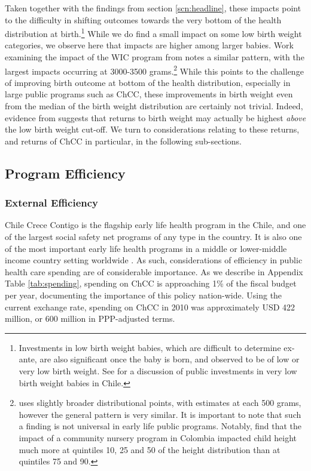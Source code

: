 \documentclass[12pt]{article}
\begin{document}
\begin{spacing}{1.4}
Taken together with the findings from section \ref{scn:headline}, these
impacts point to the difficulty in shifting outcomes towards the very
bottom of the health distribution at birth.\footnote{Investments in low
  birth weight babies, which are difficult to determine ex-ante, are also
  significant once the baby is born, and observed to be of low or very
  low birth weight.  See \citet{Bharadwajetal2013} for a discussion of
  public investments in very low birth weight babies in Chile.}  While we
do find a small impact on some low birth weight categories, we observe
here that impacts are higher among larger babies.  Work examining the
impact of the WIC program from \citet{RossinSlater2013} notes a similar
pattern, with the largest impacts occurring at 3000-3500 grams.\footnote{%
  \citet{RossinSlater2013} uses slightly broader distributional points,
  with estimates at each 500 grams, however the general pattern is very
  similar. It is important to note that such a finding is not universal
  in early life public programs.  Notably, \citet{Orazioetal2013}
  find that the impact of a community nursery program in Colombia
  impacted child height much more at quintiles 10, 25 and 50
  of the height distribution than at quintiles 75 and 90.}  While
this points to the challenge of improving birth outcome at bottom of the
health distribution, especially in large public programs such as ChCC,
these improvements in birth weight even from the median of the birth weight
distribution are certainly not trivial.  Indeed, evidence from
\citet{Royer2009} suggests that returns to birth weight may actually be
highest \emph{above} the low birth weight cut-off. We turn to considerations
relating to these returns, and returns of ChCC in particular, in the
following sub-sections.


\subsection{Program Efficiency}
\label{scn:efficiency}
\subsubsection{External Efficiency}
Chile Crece Contigo is the flagship early life health program
in the Chile, and one of the largest social safety net programs
of any type in the country.  It is also one of the most
important early life health programs in a middle or lower-middle
income country setting worldwide \citep{Richteretal2017}.  As
such, considerations of efficiency in public health care spending
are of considerable importance.  As we describe in Appendix Table
\ref{tab:spending}, spending on ChCC is approaching 1\% of the
fiscal budget per year, documenting the importance of this policy
nation-wide.  Using the current exchange rate, spending on ChCC
in 2010 was approximately USD 422 million, or 600 million in
PPP-adjusted terms.


\end{spacing}
\end{document}
